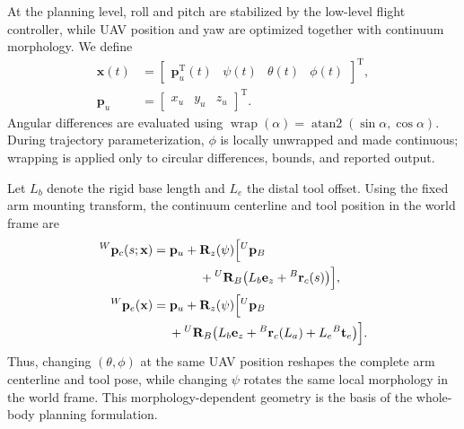 \documentclass[journal,twoside]{IEEEtran}
\newcommand{\wrap}{\operatorname{wrap}}
\begin{document}
At the planning level, roll and pitch are stabilized by the low-level flight controller, while UAV position and yaw are optimized together with continuum morphology. We define
\begin{equation}
\begin{aligned}
\mathbf x(t)&=
\begin{bmatrix}
\mathbf p_u^{\mathrm T}(t)&\psi(t)&\theta(t)&\phi(t)
\end{bmatrix}^{\!\mathrm T},\\
\mathbf p_u&=\begin{bmatrix}x_u&y_u&z_u\end{bmatrix}^{\!\mathrm T}.
\end{aligned}
\label{eq:planning_state}
\end{equation}
Angular differences are evaluated using $\wrap(\alpha)=\operatorname{atan2}(\sin\alpha,\cos\alpha)$. During trajectory parameterization, $\phi$ is locally unwrapped and made continuous; wrapping is applied only to circular differences, bounds, and reported output.

Let $L_b$ denote the rigid base length and $L_e$ the distal tool offset. Using the fixed arm mounting transform, the continuum centerline and tool position in the world frame are
\begin{align}
{}^{W}\mathbf p_c(s;\mathbf x)
&=\mathbf p_u+\mathbf R_z(\psi)\Big[{}^{U}\mathbf p_B \nonumber\\
&\hspace{1.3cm}+{}^{U}\mathbf R_B
\big(L_b\mathbf e_z+{}^{B}\mathbf r_c(s)\big)\Big],\label{eq:world_centerline}\\
{}^{W}\mathbf p_e(\mathbf x)
&=\mathbf p_u+\mathbf R_z(\psi)\Big[{}^{U}\mathbf p_B \nonumber\\
&\hspace{0.45cm}+{}^{U}\mathbf R_B\big(L_b\mathbf e_z+{}^{B}\mathbf r_c(L_a)
+L_e{}^{B}\mathbf t_e\big)\Big].
\label{eq:world_tool}
\end{align}
Thus, changing $(\theta,\phi)$ at the same UAV position reshapes the complete arm centerline and tool pose, while changing $\psi$ rotates the same local morphology in the world frame. This morphology-dependent geometry is the basis of the whole-body planning formulation.
\end{document}
